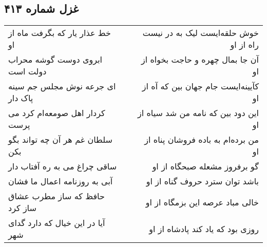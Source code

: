 \begin{center}
\section*{غزل شماره ۴۱۳}
\label{sec:sh413}
\begin{longtable}{l p{0.5cm} r}
خط عذار یار که بگرفت ماه از او
&&
خوش حلقه‌ایست لیک به در نیست راه از او
\\
ابروی دوست گوشه محراب دولت است
&&
آن جا بمال چهره و حاجت بخواه از او
\\
ای جرعه نوش مجلس جم سینه پاک دار
&&
کآیینه‌ایست جام جهان بین که آه از او
\\
کردار اهل صومعه‌ام کرد می پرست
&&
این دود بین که نامه من شد سیاه از او
\\
سلطان غم هر آن چه تواند بگو بکن
&&
من برده‌ام به باده فروشان پناه از او
\\
ساقی چراغ می به ره آفتاب دار
&&
گو برفروز مشعله صبحگاه از او
\\
آبی به روزنامه اعمال ما فشان
&&
باشد توان سترد حروف گناه از او
\\
حافظ که ساز مطرب عشاق ساز کرد
&&
خالی مباد عرصه این بزمگاه از او
\\
آیا در این خیال که دارد گدای شهر
&&
روزی بود که یاد کند پادشاه از او
\\
\end{longtable}
\end{center}
